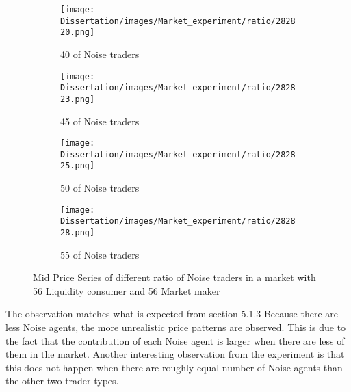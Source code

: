 \begin{figure}[h]
  \begin{subfigure}[b]{0.5\textwidth}
    \texttt{[image: Dissertation/images/Market\_experiment/ratio/282820.png]}
    \caption{40 of Noise traders}
    \label{fig:1}
  \end{subfigure}
  \begin{subfigure}[b]{0.5\textwidth}
    \texttt{[image: Dissertation/images/Market\_experiment/ratio/282823.png]}
    \caption{45 of  Noise traders}
    \label{fig:2}
  \end{subfigure}

  \begin{subfigure}[b]{0.5\textwidth}
    \texttt{[image: Dissertation/images/Market\_experiment/ratio/282825.png]}   \caption{50 of Noise traders}
    \label{fig:1}
  \end{subfigure}
  \begin{subfigure}[b]{0.5\textwidth}
    \texttt{[image: Dissertation/images/Market\_experiment/ratio/282828.png]}
    \caption{55 of Noise traders}
    \label{fig:2}
  \end{subfigure}
 \caption{Mid Price Series of different ratio of Noise traders in a market with 56 Liquidity consumer and 56 Market maker} 
\end{figure}
\FloatBarrier

The observation matches what is expected from section 5.1.3 Because there are less Noise agents, the more unrealistic price patterns are observed. This is due to the fact that the contribution of each Noise agent is larger when there are less of them in the market. Another interesting observation from the experiment is that this does not happen when there are roughly equal number of Noise agents than the other two trader types.
